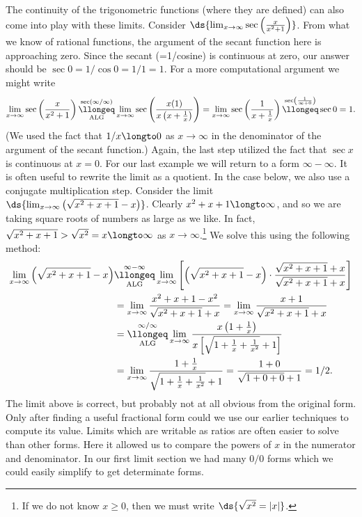 The continuity of the trigonometric functions (where they
are defined) can also come into play with these limits.
\bex Consider $\ds{\lim_{x\to\infty}\sec\left(\frac{x}{x^2+1}\right)}$. 
From what we know of rational functions, the argument of the secant
function here is approaching zero.  Since the secant (=1/cosine) is
continuous at zero, our answer should be $\sec0=1/\cos0=1/1=1$.
For a more computational argument we might write
$$\lim_{x\to\infty}\sec\left(\frac{x}{x^2+1}\right)
\underset{\text{\rm ALG}}{\overset{\sec(\infty/\infty)}{\llongeq}}
\lim_{x\to\infty}\sec\left(\frac{x(1)}{x\left(x+\frac1x\right)}\right)
=\lim_{x\to\infty}\sec\left(\frac1{x+\frac1x}\right)
\overset{\sec\left(\frac1{\infty+0}\right)}{\llongeq}\sec0=1.
$$
(We used the fact that $1/x\longto0$ as $x\to\infty$ in the
denominator of the argument of the secant function.)
Again, the last step utilized the fact that $\sec x$ is continuous
at $x=0$.\eex
For our last example we will return to a form $\infty-\infty$.
It is often useful to rewrite the limit as a quotient.  In the 
case below, we also use a conjugate multiplication step.
\bex Consider the limit $\ds{\lim_{x\to\infty}\left(\sqrt{x^2+x+1}-x\right)}$.
Clearly $x^2+x+1\longto\infty$, and so we are taking square roots of
numbers as large as we like.  In fact, $\sqrt{x^2+x+1}>\sqrt{x^2}=x
\longto\infty$ as $x\to\infty$.\footnote{%
If we do not know $x\ge0$, then we must write $\ds{\sqrt{x^2}=|x|}$.}
We solve this using the following method:
\begin{align*}
\lim_{x\to\infty}\left(\sqrt{x^2+x+1}-x\right)
&\overset{\infty-\infty}{\underset{\text{ALG}}{\llongeq}}
\lim_{x\to\infty}\left[\left(\sqrt{x^2+x+1}-x\right)
\cdot\frac{\sqrt{x^2+x+1}+x}{\sqrt{x^2+x+1}+x}\right]\\
&=\lim_{x\to\infty}\frac{x^2+x+1-x^2}{\sqrt{x^2+x+1}+x}
=\lim_{x\to\infty}\frac{x+1}{\sqrt{x^2+x+1}+x}\\
&=\overset{\infty/\infty}{\underset{\text{ALG}}{\llongeq}}
\lim_{x\to\infty}\frac{x\left(1+\frac1x\right)}
{x\left[\sqrt{1+\frac1x+\frac1{x^2}}+1\right]}\\
&=\lim_{x\to\infty}\frac{1+\frac1x}{\sqrt{1+\frac1x+\frac1{x^2}}+1}
=\frac{1+0}{\sqrt{1+0+0}+1}=1/2.
\end{align*}\eex
The limit above is correct, but probably not at all obvious
from the original form.  Only after finding a useful
fractional form could we use our earlier techniques to compute
its value.  Limits which are writable as ratios are often
easier to solve than other forms.  Here it allowed us
to compare the powers of $x$ in the numerator and denominator.
In our first limit section we had many $0/0$ forms which 
we could easily simplify to get determinate forms.


